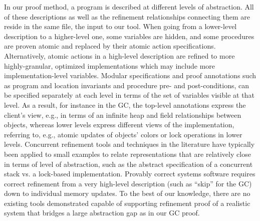 In our proof method, a program is described at different levels of abstraction. All of these descriptions as well as the refinement relationships connecting them are reside in the same \civl file, the input to our tool. 
When going from a lower-level description to a higher-level one, some variables are hidden, and some procedures are proven atomic and replaced by their atomic action specifications. Alternatively, atomic actions in a high-level description are refined to more highly-granular, optimized implementations which may include more implementation-level variables. Modular specifications and proof annotations such as program and location invariants and procedure pre- and post-conditions, can be specified separately at each level in terms of the set of variables visible at that level. 
As a result, for instance in the GC, the top-level annotations express the client's view, e.g., in terms of an infinite heap and field relationships between objects, 
 whereas lower levels express different views of the implementation, referring to, e.g., atomic updates of objects' colors or lock operations in lower levels. 
Concurrent refinement tools and techniques in the literature have typically been applied to small examples to relate representations that are relatively close in terms of level of abstraction, such as the abstract specification of a concurrent stack vs. a lock-based implementation. Provably correct systems software requires correct refinement from a very high-level description (such as ``skip'' for the GC) down to individual memory updates. To the best of our knowledge, there are no existing tools demonstrated capable of supporting refinement proof of a realistic system that bridges a large abstraction gap as in our GC proof. 

